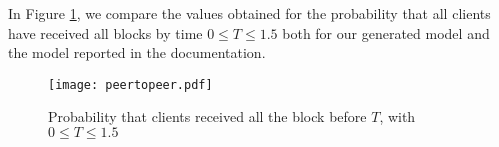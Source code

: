 In Figure \ref{ex2-res}, we compare the values obtained for the probability that all clients have received all blocks by time $0\leq T\leq 1.5$ both for our generated model and the model reported in the documentation.
\begin{figure}[h]
\centering
\texttt{[image: peertopeer.pdf]}	
\caption{Probability that clients received all the block before $T$, with $0\leq T \leq 1.5$}
\label{ex2-res}
\end{figure}
\begin{comment}

\subsection{Random Graphs Protocol}
\begin{wrapfigure}[8]{l}{4cm}
	\texttt{[image: network.pdf]}	
\end{wrapfigure} 
The second case study we report is the random graphs protocol presented in the PRISM documentation\footnote{\url{https://www.prismmodelchecker.org/casestudies/graph_connected.php}}.
It investigates the likelihood that a pair of nodes are connected in a
 random graph. More precisely, we take into account the the set of random graphs $G(n,p)$,
  i.e. the set of random graphs with $n$ nodes where the probability of there being an edge 
  between any two nodes equals $p$. 

  The model is divided in two parts: at the beginning the random graph is built.
Then the algorithm finds nodes that have a path to node 2 by searching for nodes for which one can reach (in one step) a node for which the existence of a path to node 2 has already been found.

The choreographic model is shown in Listing \ref{ex4-code}, while
in Listing \ref{ex4-gen}, we report only part of the generated PRISM module (the modules $M_2$, $M_3$ and $P_2$, $P_3$ are equivalent to, respectively, $M_1$ and $P_2$ and can be found in the repository\footnote{\url{https://github.com/adeleveschetti/choreography-to-PRISM}}).

\begin{lstlisting}[style=chor-color,breaklines=true, postbreak=\mbox{\textcolor{red}{$\hookrightarrow$}\space},caption={Choreography for the Random Graphs
	Protocol.},captionpos=b,label={ex4-code}]
preamble
"mdp"
"const double p;"
endpreamble

n = 3;

PC -> PC : " ";
M[i] -> i in [1...n]  M[i] : "varM[i] : bool;";
P[i] -> i in [1...n] P[i] : "varP[i] : bool;";


\end{comment}

